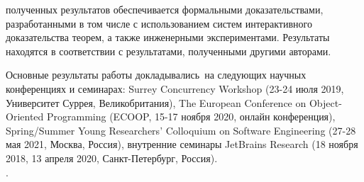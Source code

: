 {\reliability} полученных результатов обеспечивается 
формальными доказательствами, разработанными в том числе с использованием
систем интерактивного доказательства теорем, 
а также инженерными экспериментами. 
Результаты находятся в соответствии с результатами, полученными другими авторами.

{\probation}
Основные результаты работы докладывались~на
следующих научных конференциях и семинарах:
Surrey Concurrency Workshop (23-24 июля 2019, Университет Суррея, Великобритания),
The European Conference on Object-Oriented Programming
(ECOOP, 15-17 ноября 2020, онлайн конференция),
Spring/Summer Young Researchers' Colloquium on Software Engineering
(27-28 мая 2021, Москва, Россия),
внутренние семинары JetBrains Research
(18 ноября 2018, 13 апреля 2020, Санкт-Петербург, Россия). \\
.


